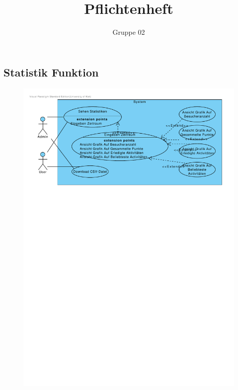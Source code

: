 \documentclass[10pt,a4paper]{article}
\author{Gruppe 02}
\title{Pflichtenheft}
\begin{document}
	\subsection{Statistik Funktion}
	\begin{figure}[h]
		\includegraphics[width=\linewidth]{gfx/webseite/statistikfunktion.pdf}
	\end{figure}
\end{document}
